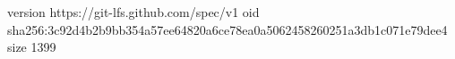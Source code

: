 version https://git-lfs.github.com/spec/v1
oid sha256:3c92d4b2b9bb354a57ee64820a6ce78ea0a5062458260251a3db1c071e79dee4
size 1399
